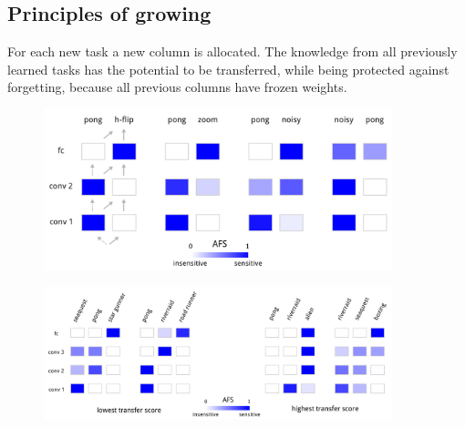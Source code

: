 \documentclass[a4paper,twocolumn]{article}
\begin{document}
\subsection*{Principles of growing}
For each new task a new column is allocated. The knowledge from all previously learned tasks has the potential to be transferred, while being protected against forgetting, because all previous columns have frozen weights.


    \begin{figure}[ht]
        \centering
        \includegraphics[width=0.9\textwidth]{2-column.png}
    \end{figure}

    \begin{figure}[ht]
        \centering
        \includegraphics[width=0.9\textwidth]{3-column.png}
    \end{figure}
\end{document}
